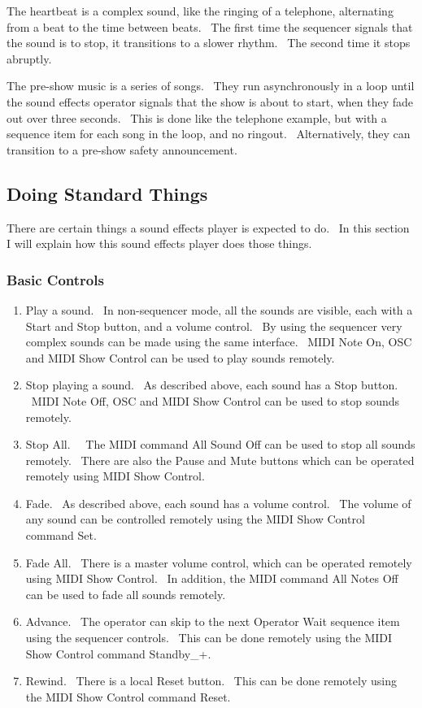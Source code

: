 \documentclass[letterpaper]{article}
\newcommand\liststyleLxxiv{%
\renewcommand\theenumi{\arabic{enumi}}
\renewcommand\theenumii{\arabic{enumii}}
\renewcommand\theenumiii{\arabic{enumiii}}
\renewcommand\theenumiv{\arabic{enumiv}}
\renewcommand\labelenumi{\theenumi.}
\renewcommand\labelenumii{\theenumii.}
\renewcommand\labelenumiii{\theenumiii.}
\renewcommand\labelenumiv{\theenumiv.}
}
\begin{document}
The heartbeat is a complex sound, like the ringing of a telephone,
alternating from a beat to the time between beats. \ The first time the
sequencer signals that the sound is to stop, it transitions to a slower
rhythm. \ The second time it stops abruptly.

The pre-show music is a series of songs. \ They run asynchronously in a
loop until the sound effects operator signals that the show is about to
start, when they fade out over three seconds. \ This is done like the
telephone example, but with a sequence item for each song in the loop,
and no ringout. \ Alternatively, they can transition to a pre-show
safety announcement.

\subsection{Doing Standard Things}
There are certain things a sound effects player is expected to do. \ In
this section I will explain how this sound effects player does those
things.

\subsubsection{Basic Controls}
\liststyleLxxiv
\begin{enumerate}
\item Play a sound. \ In non-sequencer mode, all the sounds are visible,
each with a Start and Stop button, and a volume control. \ By using the
sequencer very complex sounds can be made using the same interface.
\ MIDI Note On, OSC and MIDI Show Control can be used to play sounds
remotely.
\item Stop playing a sound. \ As described above, each sound has a Stop
button. \ MIDI Note Off, OSC and MIDI Show Control can be used to stop
sounds remotely.
\item Stop All. \ \ The MIDI command All Sound Off can be used to stop
all sounds remotely. \ There are also the Pause and Mute buttons which
can be operated remotely using MIDI Show Control.
\item Fade. \ As described above, each sound has a volume control. \ The
volume of any sound can be controlled remotely using the MIDI Show
Control command Set.
\item Fade All. \ There is a master volume control, which can be
operated remotely using MIDI Show Control. \ In addition, the MIDI
command All Notes Off can be used to fade all sounds remotely.
\item Advance. \ The operator can skip to the next Operator Wait
sequence item using the sequencer controls. \ This can be done remotely
using the MIDI Show Control command Standby\_+.
\item Rewind. \ There is a local Reset button. \ This can be done
remotely using the MIDI Show Control command Reset.
\end{enumerate}
\end{document}
